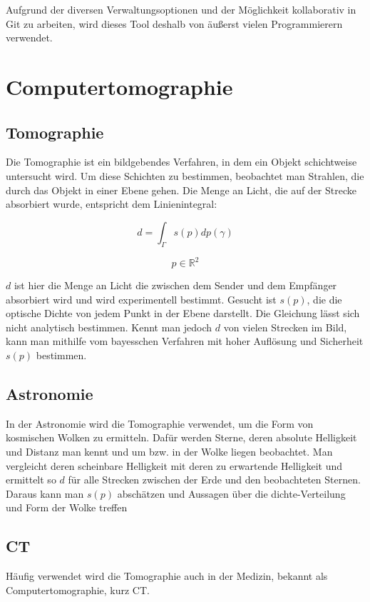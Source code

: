 \documentclass[]{dsadokumentation}
\begin{document}
Aufgrund der diversen Verwaltungsoptionen und der Möglichkeit kollaborativ in Git zu arbeiten, wird dieses Tool deshalb von äußerst vielen Programmierern verwendet.

\section{Computertomographie}

\subsection{Tomographie}

Die Tomographie ist ein bildgebendes Verfahren, in dem ein Objekt schichtweise untersucht wird. Um diese Schichten zu bestimmen, beobachtet man Strahlen, die durch das Objekt in einer Ebene gehen. Die Menge an Licht, die auf der Strecke absorbiert wurde, entspricht dem Linienintegral:

$$d=\int_{\Gamma}{}s(p)dp(\gamma)$$

$$p\in \mathbb{R}^2$$

$d$ ist hier die Menge an Licht die zwischen dem Sender und dem Empfänger absorbiert wird und wird experimentell bestimmt. Gesucht ist $s(p)$, die die optische Dichte von jedem Punkt in der Ebene darstellt. Die Gleichung lässt sich nicht analytisch bestimmen. Kennt man jedoch $d$ von vielen Strecken im Bild, kann man mithilfe vom bayesschen Verfahren mit hoher Auflösung und Sicherheit $s(p)$ bestimmen.

\subsection{Astronomie}

In der Astronomie wird die Tomographie verwendet, um die Form von kosmischen Wolken zu ermitteln. Dafür werden Sterne, deren absolute Helligkeit und Distanz man kennt und um bzw. in der Wolke liegen beobachtet. Man vergleicht deren scheinbare Helligkeit mit deren zu erwartende Helligkeit und ermittelt so $d$ für alle Strecken zwischen der Erde und den beobachteten Sternen. Daraus kann man $s(p)$ abschätzen und Aussagen über die dichte-Verteilung und Form der Wolke treffen

\subsection{CT}

Häufig verwendet wird die Tomographie auch in der Medizin, bekannt als Computertomographie, kurz CT.
\end{document}
